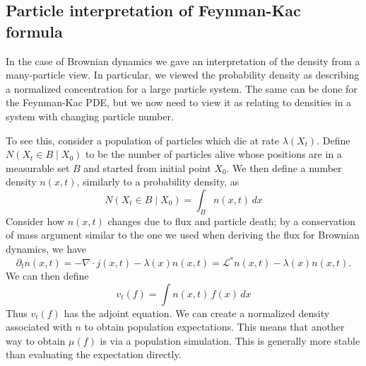 \documentclass[11pt]{article}
\begin{document}
\subsection*{Particle interpretation of Feynman-Kac formula}
In the case of Brownian dynamics we gave an interpretation of the density from a many-particle view. In particular, we viewed the probability density as describing a normalized concentration for a large particle system. The same can be done for the Feynman-Kac PDE, but we now need to view it as relating to densities in a system with changing particle number.

 To see this, consider a population of particles which die at rate $\lambda(X_t)$. Define $N(X_t \in B\mid X_0)$ to be the number of particles alive whose positions are in a measurable set $B$ and started from initial point $X_0$. We then define a number density $n(x,t)$, similarly to a probability density, as 
\begin{equation}
N(X_t \in B\mid X_0) = \int_B n(x,t)\,dx
\end{equation}
Consider how $n(x,t)$ changes due to flux and particle death; by a conservation of mass argument similar to the one we used when deriving the flux for Brownian dynamics, we have 
\begin{equation}
\partial_t n(x,t) = -\nabla \cdot j(x,t) - \lambda(x)n(x,t) = {\mathcal L}^*n(x,t) - \lambda(x)n(x,t).
\end{equation}
We can then define  
\begin{equation}
v_t(f) = \int n(x,t)\,f(x)\,dx 
\end{equation}
Thus $v_t(f)$ has the adjoint equation. We can create a normalized density associated with $n$ to obtain population expectations. This means that another way to obtain $\mu(f)$ is via a population simulation. This is generally more stable than evaluating the expectation directly. 
\end{document}
